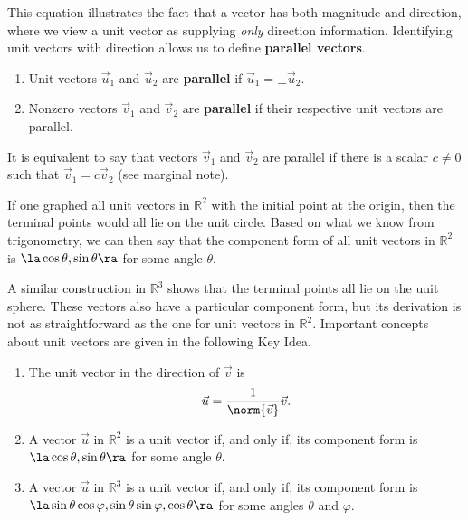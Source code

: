 This equation illustrates the fact that a vector has both magnitude and direction, where we view a unit vector as supplying \textit{only} direction information. Identifying unit vectors with direction allows us to define \textbf{parallel vectors}.

{\begin{enumerate}
	\item Unit vectors $\vec u_1$ and $\vec u_2$ are \textbf{parallel} if $\vec u_1 = \pm \vec u_2$.
	\item	Nonzero vectors $\vec v_1$ and $\vec v_2$ are \textbf{parallel} if their respective unit vectors are parallel.
\end{enumerate}
}

It is equivalent to say that vectors $\vec v_1$ and $\vec v_2$ are parallel if there is a scalar $c\neq 0$ such that $\vec v_1 = c\vec v_2$ (see marginal note).

If one graphed all unit vectors in $\mathbb{R}^2$ with the initial point at the origin, then the terminal points would all lie on the unit circle. Based on what we know from trigonometry, we can then say that the component form of all unit vectors in $\mathbb{R}^2$ is $\la \cos\theta,\sin\theta\ra$ for some angle $\theta$.

A similar construction in $\mathbb{R}^3$ shows that the terminal points all lie on the unit sphere. These vectors also have a particular component form, but its derivation is not as straightforward as the one for unit vectors in $\mathbb{R}^2$. Important concepts about unit vectors are given in the  following Key Idea. 

{\begin{enumerate}
\item		The unit vector in the direction of $\vec v$ is $$ \vec u = \frac1{\norm{\vec v}} \vec v.$$

\item A vector $\vec u$ in $\mathbb{R}^2$ is a unit vector if, and only if, its component form is $\la \cos\theta,\sin\theta\ra$ for some angle $\theta$.
	\item		A vector $\vec u$ in $\mathbb{R}^3$ is a unit vector if, and only if, its component form is $\la \sin\theta\cos\varphi,\sin\theta\sin\varphi,\cos\theta\ra$ for some angles $\theta$ and $\varphi$.
\end{enumerate}}

